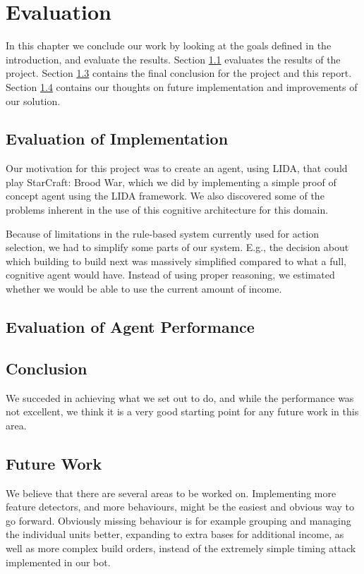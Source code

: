 
\chapter{Evaluation}
In this chapter we conclude our work by looking at the goals defined in the
introduction, and evaluate the results.
Section \ref{sec:evalres} evaluates the results of the project.
Section \ref{sec:conclusion} contains the final conclusion for the project and this report. 
Section \ref{sec:futurework} contains our thoughts on future implementation and improvements of our solution.


\section{Evaluation of Implementation}
\label{sec:evalres}
Our motivation for this project was to create an agent, using LIDA, that could play StarCraft: Brood War, which we did by implementing a simple proof of concept agent using the LIDA framework.  We also discovered some of the problems inherent in the use of this cognitive architecture for this domain.

Because of limitations in the rule-based system currently used for action selection, we had to simplify some parts of our system. E.g., the decision about which building to build next was massively simplified compared to what a full, cognitive agent would have. Instead of using proper reasoning, we estimated whether we would be able to use the current amount of income.

\section{Evaluation of Agent Performance}


\section{Conclusion}
\label{sec:conclusion}
We succeded in achieving what we set out to do, and while the performance was not excellent, we think it is a very good starting point for any future work in this area.

\section{Future Work}
\label{sec:futurework}
We believe that there are several areas to be worked on. Implementing more feature detectors, and more behaviours, might be the easiest and obvious way to go forward. Obviously missing behaviour is for example grouping and managing the individual units better, expanding to extra bases for additional income, as well as more complex build orders, instead of the extremely simple timing attack implemented in our bot.

